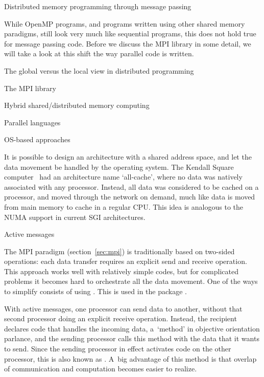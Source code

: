 
 {Distributed memory programming through message passing}

While OpenMP programs, and programs written using other shared memory
paradigms, still look very much like sequential programs, this does
not hold true for message passing code. Before we discuss the \acf{MPI}
library in some detail, we will take a look at this shift the way
parallel code is written.

 {The global versus the local view in distributed programming}
\label{sec:distributed-programming}


 {The MPI library}
\label{sec:mpi}


 {Hybrid shared/distributed memory computing}
\label{sec:hybrid}


 {Parallel languages}
\label{sec:pgas}


 {OS-based approaches}

It is possible to design an architecture with a shared address space,
and let the data movement be handled by the operating system. The
Kendall Square computer~\cite{KSRallcache} had an architecture name
`all-cache', where no data was natively associated with any
processor. Instead, all data was considered to be cached on a
processor, and moved through the network on demand, much like data is
moved from main memory to cache in a regular CPU. This idea 
is analogous to the \ac{NUMA} support in current SGI architectures.

 {Active messages}
\label{sec:charm++}

The MPI paradigm (section~\ref{sec:mpi}) is traditionally based on
two-sided operations: each data transfer requires an explicit send and
receive operation. This approach works well with relatively simple
codes, but for complicated problems it becomes hard to orchestrate all
the data movement. One of the ways to simplify consists of using
. This is used in the package
\cite{charmpp}.

With active messages, one processor can send data to another, without
that second processor doing an explicit receive operation. Instead,
the recipient declares code that handles the incoming data, a~`method'
in objective orientation parlance, and the sending processor calls
this method with the data that it wants to send. Since the sending
processor in effect activates code on the other processor, this is
also known as . A~big advantage of
this method is that overlap of communication and computation becomes
easier to realize.


